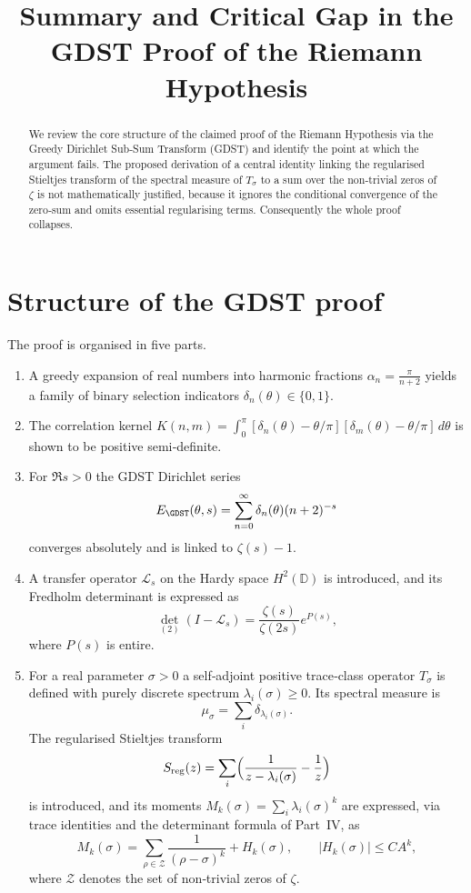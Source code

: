 \documentclass[11pt,a4paper]{article}
\title{Summary and Critical Gap in the GDST Proof of the Riemann Hypothesis}
\author{}
\date{}
\theoremstyle{definition}
\newcommand{\Z}{\mathcal{Z}}          %
\newcommand{\LOp}{\mathcal{L}}
\begin{document}
\maketitle

\begin{abstract}
We review the core structure of the claimed proof of the Riemann Hypothesis via the Greedy Dirichlet Sub‑Sum Transform (GDST) and identify the point at which the argument fails.  The proposed derivation of a central identity linking the regularised Stieltjes transform of the spectral measure of \(T_\sigma\) to a sum over the non‑trivial zeros of \(\zeta\) is not mathematically justified, because it ignores the conditional convergence of the zero‑sum and omits essential regularising terms.  Consequently the whole proof collapses.
\end{abstract}

\section{Structure of the GDST proof}
The proof is organised in five parts.
\begin{enumerate}
  \item A greedy expansion of real numbers into harmonic fractions \(\alpha_n = \frac{\pi}{n+2}\) yields a family of binary selection indicators \(\delta_n(\theta)\in\{0,1\}\).
  \item The correlation kernel \(K(n,m)=\int_0^\pi[\delta_n(\theta)-\theta/\pi][\delta_m(\theta)-\theta/\pi]\,d\theta\) is shown to be positive semi‑definite.
  \item For \(\Re s>0\) the GDST Dirichlet series 
    \[
    E_{\GDST}(\theta,s)=\sum_{n=0}^\infty \delta_n(\theta)(n+2)^{-s}
    \]
    converges absolutely and is linked to \(\zeta(s)-1\).
  \item A transfer operator \(\LOp_s\) on the Hardy space \(H^2(\mathbb{D})\) is introduced, and its Fredholm determinant is expressed as
    \[
    {\det}_{(2)}(I-\LOp_s)=\frac{\zeta(s)}{\zeta(2s)}e^{P(s)},
    \]
    where \(P(s)\) is entire.
  \item For a real parameter \(\sigma>0\) a self‑adjoint positive trace‑class operator \(T_\sigma\) is defined with purely discrete spectrum \(\lambda_i(\sigma)\ge0\).  Its spectral measure is
    \[
    \mu_\sigma = \sum_i \delta_{\lambda_i(\sigma)}.
    \]
    The regularised Stieltjes transform
    \[
    S_{\mathrm{reg}}(z)=\sum_i\Bigl(\frac1{z-\lambda_i(\sigma)}-\frac1z\Bigr)
    \]
    is introduced, and its moments \(M_k(\sigma)=\sum_i\lambda_i(\sigma)^k\) are expressed, via trace identities and the determinant formula of Part~IV, as
    \[
    M_k(\sigma)=\sum_{\rho\in\Z}\frac1{(\rho-\sigma)^k}+H_k(\sigma),\qquad |H_k(\sigma)|\le C A^k,
    \]
    where \(\Z\) denotes the set of non‑trivial zeros of \(\zeta\).
\end{enumerate}
\end{document}
